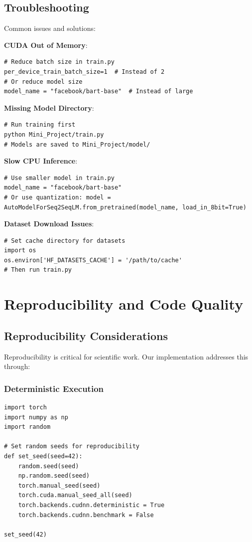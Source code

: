 \documentclass[12pt,a4paper,oneside]{report}
\begin{document}
\section{Troubleshooting}
Common issues and solutions:

\textbf{CUDA Out of Memory}:
\begin{lstlisting}
# Reduce batch size in train.py
per_device_train_batch_size=1  # Instead of 2
# Or reduce model size
model_name = "facebook/bart-base"  # Instead of large
\end{lstlisting}

\textbf{Missing Model Directory}:
\begin{lstlisting}
# Run training first
python Mini_Project/train.py
# Models are saved to Mini_Project/model/
\end{lstlisting}

\textbf{Slow CPU Inference}:
\begin{lstlisting}
# Use smaller model in train.py
model_name = "facebook/bart-base"
# Or use quantization: model = AutoModelForSeq2SeqLM.from_pretrained(model_name, load_in_8bit=True)
\end{lstlisting}

\textbf{Dataset Download Issues}:
\begin{lstlisting}
# Set cache directory for datasets
import os
os.environ['HF_DATASETS_CACHE'] = '/path/to/cache'
# Then run train.py
\end{lstlisting}

\chapter{Reproducibility and Code Quality}
\label{app:reproducibility}

\section{Reproducibility Considerations}
Reproducibility is critical for scientific work. Our implementation addresses this through:

\subsection{Deterministic Execution}
\begin{lstlisting}
import torch
import numpy as np
import random

# Set random seeds for reproducibility
def set_seed(seed=42):
    random.seed(seed)
    np.random.seed(seed)
    torch.manual_seed(seed)
    torch.cuda.manual_seed_all(seed)
    torch.backends.cudnn.deterministic = True
    torch.backends.cudnn.benchmark = False

set_seed(42)
\end{lstlisting}
\end{document}
